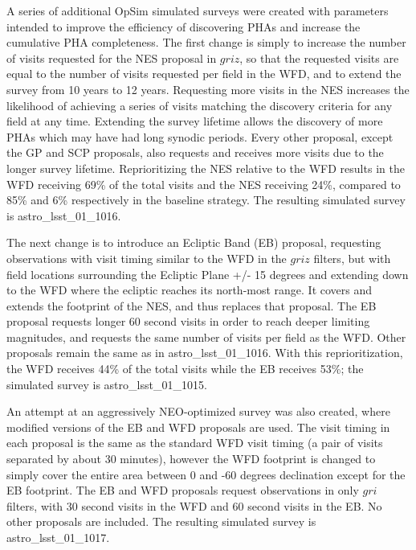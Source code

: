 A series of additional OpSim simulated surveys were created with parameters intended to improve the efficiency of discovering PHAs and increase the cumulative PHA completeness. The first change is simply to increase the number of visits requested for the NES proposal in $griz$, so that the requested visits are equal to the number of visits requested per field in the WFD, and to extend the survey from 10 years to 12 years. Requesting more visits in the NES increases the likelihood of achieving a series of visits matching the discovery criteria for any field at any time. Extending the survey lifetime allows the discovery of more PHAs which may have had long synodic periods. Every other proposal, except the GP and SCP proposals, also requests and receives more visits due to the longer survey lifetime. Reprioritizing the NES relative to the WFD results in the WFD receiving 69\% of the total visits and the NES receiving 24\%, compared to 85\% and 6\% respectively in the baseline strategy. The resulting simulated survey is astro\_lsst\_01\_1016.  

The next change is to introduce an Ecliptic Band (EB) proposal, requesting observations with visit timing similar to the WFD in the $griz$ filters, but with field locations surrounding the Ecliptic Plane +/- 15 degrees and extending down to the WFD where the ecliptic reaches its north-most range. It covers and extends the footprint of the NES, and thus replaces that proposal. The EB proposal requests longer 60 second visits in order to reach deeper limiting magnitudes, and requests the same number of visits per field as the WFD. Other proposals remain the same as in astro\_lsst\_01\_1016. With this reprioritization, the WFD receives 44\% of the total visits while the EB receives 53\%; the simulated survey is astro\_lsst\_01\_1015. 

An attempt at an aggressively NEO-optimized survey was also created, where modified versions of the EB and WFD proposals are used. The visit timing in each proposal is the same as the standard WFD visit timing (a pair of visits separated by about 30 minutes), however the WFD footprint is changed to simply cover the entire area between 0 and -60 degrees declination except for the EB footprint. The EB and WFD proposals request observations in only $gri$ filters, with 30 second visits in the WFD and 60 second visits in the EB. No other proposals are included. The resulting simulated survey is astro\_lsst\_01\_1017. 

